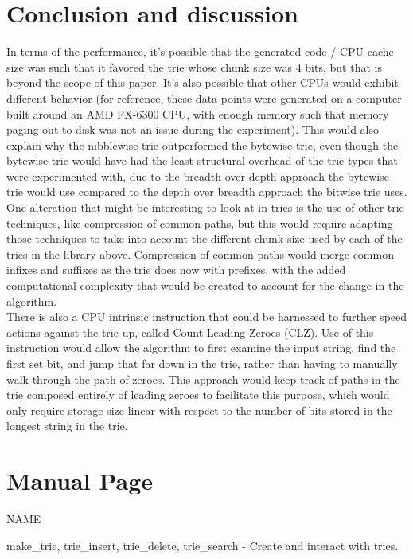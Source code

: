 \documentclass{llncs}
\begin{document}
\section{Conclusion and discussion}
In terms of the performance, it's possible that the generated code / CPU cache size was such that it favored the trie whose chunk size was 4 bits, but that is beyond the scope of this paper. It's also possible that other CPUs would exhibit different behavior (for reference, these data points were generated on a computer built around an AMD FX-6300 CPU, with enough memory such that memory paging out to disk was not an issue during the experiment). This would also explain why the nibblewise trie outperformed the bytewise trie, even though the bytewise trie would have had the least structural overhead of the trie types that were experimented with, due to the breadth over depth approach the bytewise trie would use compared to the depth over breadth approach the bitwise trie uses.\\
One alteration that might be interesting to look at in tries is the use of other trie techniques, like compression of common paths, but this would require adapting those techniques to take into account the different chunk size used by each of the tries in the library above. Compression of common paths would merge common infixes and suffixes as the trie does now with prefixes, with the added computational complexity that would be created to account for the change in the algorithm.\\
There is also a CPU intrinsic instruction that could be harnessed to further speed actions against the trie up, called Count Leading Zeroes (CLZ). Use of this instruction would allow the algorithm to first examine the input string, find the first set bit, and jump that far down in the trie, rather than having to manually walk through the path of zeroes. This approach would keep track of paths in the trie composed entirely of leading zeroes to facilitate this purpose, which would only require storage size linear with respect to the number of bits stored in the longest string in the trie. \\
\newpage
\section{Manual Page}
\noindent NAME

make\_trie, trie\_insert, trie\_delete, trie\_search - Create and interact with tries.\\
\end{document}
